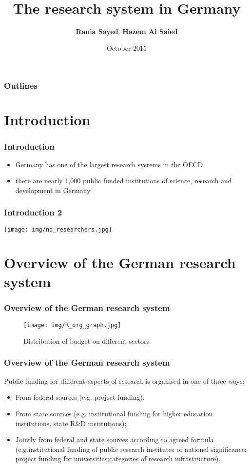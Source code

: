 \documentclass[9pt, compress]{beamer}
\author{\textbf{Rania Sayed}, \textbf{Hazem Al Saied} }
\title{The research system in Germany}
\institute{\textbf{Uinversité de Lorraine}}
\date{October 2015}
\begin{document}
    \maketitle
    \begin{frame}
        \frametitle{Outlines}
        \tableofcontents{}
    \end{frame}
\section{Introduction}
    \begin{frame}
        \frametitle{Introduction}
        \begin{itemize}
            \item Germany has one of the largest research systems in the OECD
            \item there are nearly 1,000 public   funded institutions of science, research and development in Germany
             
        \end{itemize}
    \end{frame}

    \begin{frame} %
        \frametitle{Introduction 2}
        \texttt{[image: img/no\_researchers.jpg]}
        
    \end{frame}
    \section{Overview of the German research system}
    \begin{frame} 
        \frametitle{Overview of the German research system}
        \begin{figure}
        \texttt{[image: img/R\_org\_graph.jpg]}
        \caption{Distribution of budget on different sectors}
        \end{figure}
    \end{frame}
    
    \begin{frame} 
        \frametitle{Overview of the German research system}
        
            Public funding for different aspects of research is organised in one of three ways: 
            \begin{itemize}
            \item From federal sources (e.g. project funding); 
            \item From state sources (e.g. institutional funding for higher education
institutions, state R\&D institutions); 
            \item Jointly from federal and state sources according to agreed formula (e.g.institutional funding of public research institutes of national significance; project funding for universities;categories of research infrastructure).
        \end{itemize}
    
    \end{frame}
\end{document}
